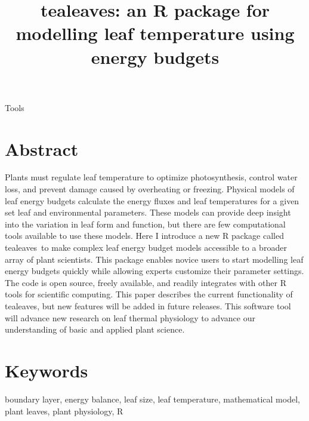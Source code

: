 \documentclass[11pt, oneside]{article}
\newcommand{\pkg}[1]{{\fontseries{b}\selectfont #1}}
\newcommand{\tealeaves}{\pkg{tealeaves}}
\begin{document}
\title{\tealeaves: an R package for modelling leaf temperature using energy budgets}
\author{}
\date{} %

\begin{center}
Tools 
\end{center}

{\let\newpage\relax\maketitle}


\section*{Abstract}

Plants must regulate leaf temperature to optimize photosynthesis, control water loss, and prevent damage caused by overheating or freezing. Physical models of leaf energy budgets calculate the energy fluxes and leaf temperatures for a given set leaf and environmental parameters. These models can provide deep insight into the variation in leaf form and function, but there are few computational tools available to use these models. Here I introduce a new R package called \tealeaves~to make complex leaf energy budget models accessible to a broader array of plant scientists. This package enables novice users to start modelling leaf energy budgets quickly while allowing experts customize their parameter settings. The code is open source, freely available, and readily integrates with other R tools for scientific computing. This paper describes the current functionality of \tealeaves, but new features will be added in future releases. This software tool will advance new research on leaf thermal physiology to advance our understanding of basic and applied plant science.

\section*{Keywords}

boundary layer, energy balance, leaf size, leaf temperature, mathematical model, plant leaves, plant physiology, R
\end{document}

